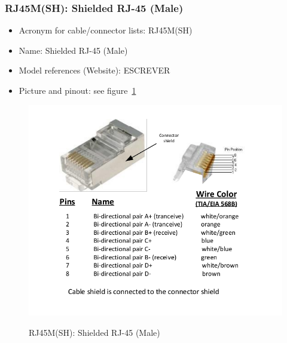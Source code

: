\subsubsection{RJ45M(SH): Shielded RJ-45 (Male)} \label{DEVICE:RJ45M(SH)}
\begin{itemize}
  \item Acronym for cable/connector lists: RJ45M(SH)
  \item Name: Shielded RJ-45 (Male)
  \item Model references (Website): ESCREVER
  \item Picture and pinout: see figure~\ref{FIG:DEVICERJ45M(SH)}
\end{itemize}
\begin{figure}
  \centering
  \includegraphics[angle=90,width=1\columnwidth]{figs/body02/FIGDEVICERJ45M(SH).pdf}\\
  \caption[RJ45M(SH): Shielded RJ-45 (Male)]{RJ45M(SH): Shielded RJ-45 (Male)}
  \label{FIG:DEVICERJ45M(SH)}
\end{figure}
